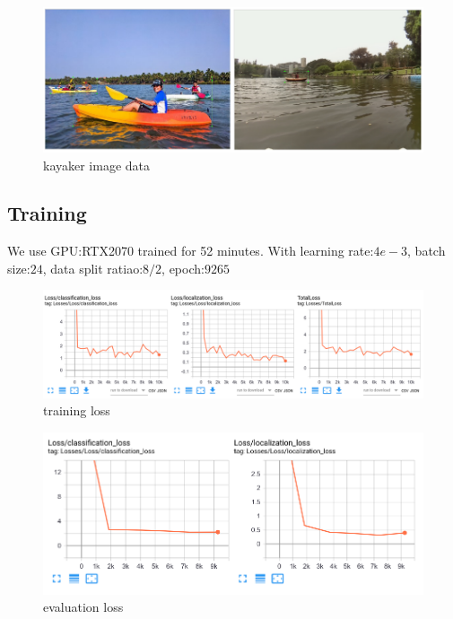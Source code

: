 \begin{figure}[H]
    \includegraphics[width=1\columnwidth]{images/kayaker.png}
    \centering
    \caption{kayaker image data}
    \label{figure:kayaker}
\end{figure}

\subsection{Training}

We use GPU:RTX2070 trained for 52 minutes. With learning rate:$4e-3$, batch size:$24$, data split ratiao:$8/2$, epoch:$9265$

\begin{figure}[ht]
    \includegraphics[width=1\columnwidth]{images/train_loss.png}
    \centering
    \caption{training loss}
    \label{figure:training_loss}
\end{figure}

\begin{figure}[H]
    \includegraphics[width=1\columnwidth]{images/eval_loss.png}
    \centering
    \caption{evaluation loss}
    \label{figure:eval_loss}
\end{figure}

